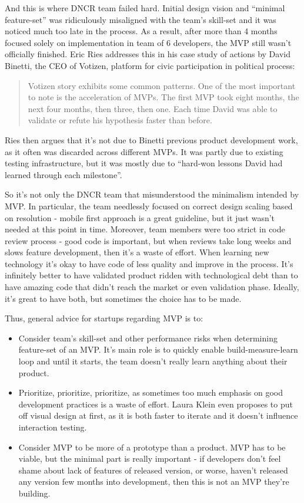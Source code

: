 \documentclass{article}
\begin{document}
And this is where DNCR team failed hard. Initial design vision and ``minimal feature-set'' was ridiculously misaligned with the team's skill-set and it was noticed much too late in the process. As a result, after more than 4 months focused solely on implementation in team of 6 developers, the MVP still wasn't officially finished. Eric Ries \cite{ries2011lean} addresses this in his case study of actions by David Binetti, the CEO of Votizen, platform for civic participation in political process:
\begin{quote}
Votizen story exhibits some common patterns. One of the most important to note is the acceleration of MVPs. The first MVP took eight months, the next four months, then three, then one. Each time David was able to validate or refute his hypothesis faster than before. 
\end{quote}
Ries then argues that it's not due to Binetti previous product development work, as it often was discarded across different MVPs. It was partly due to existing testing infrastructure, but it was mostly due to ``hard-won lessons David had learned through each milestone''.

So it's not only the DNCR team that misunderstood the minimalism intended by MVP. In particular, the team needlessly focused on correct design scaling based on resolution - mobile first approach is a great guideline, but it just wasn't needed at this point in time. Moreover, team members were too strict in code review process - good code is important, but when reviews take long weeks and slows feature development, then it's a waste of effort. When learning new technology it's okay to have code of less quality and improve in the process. It's infinitely better to have validated product ridden with technological debt than to have amazing code that didn't reach the market or even validation phase. Ideally, it's great to have both, but sometimes the choice has to be made.

Thus, general advice for startups regarding MVP is to:
\begin{itemize}
\item Consider team's skill-set and other performance risks when determining feature-set of an MVP. It's main role is to quickly enable build-measure-learn loop and until it starts, the team doesn't really learn anything about their product.
\item Prioritize, prioritize, prioritize, as sometimes too much emphasis on good development practices is a waste of effort. Laura Klein \cite{klein2013ux} even proposes to put off visual design at first, as it is both faster to iterate and it doesn't influence interaction testing.
\item Consider MVP to be more of a prototype than a product. MVP has to be viable, but the minimal part is really important - if developers don't feel shame about lack of features of released version, or worse, haven't released any version few months into development, then this is not an MVP they're building.
\end{itemize}
\end{document}

